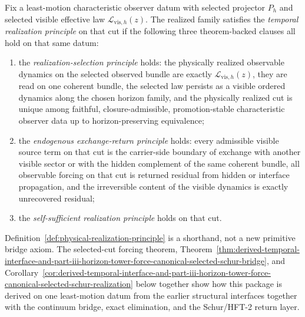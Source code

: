 \begin{definition}
\label{def:physical-realization-principle}
Fix a least-motion characteristic observer datum with selected projector
\(P_h\) and selected visible effective law \(\mathcal L_{\mathrm{vis},h}(z)\).
The realized family satisfies the \emph{temporal realization principle} on that
cut if the following three theorem-backed clauses all hold on that same datum:
\begin{enumerate}[label=(\roman*), leftmargin=2em, itemsep=0.2em]
\item the \emph{realization-selection principle} holds: the physically
      realized observable dynamics on the selected observed bundle are exactly
      \(\mathcal L_{\mathrm{vis},h}(z)\), they are read on one coherent
      bundle, the selected law persists as a visible ordered dynamics along the
      chosen horizon family, and the physically realized cut is unique among
      faithful, closure-admissible, promotion-stable characteristic observer
      data up to horizon-preserving equivalence;
\item the \emph{endogenous exchange-return principle} holds: every admissible
      visible source term on that cut is the carrier-side boundary of exchange
      with another visible sector or with the hidden complement of the same
      coherent bundle, all observable forcing on that cut is returned
      residual from hidden or interface propagation, and the irreversible
      content of the visible dynamics is exactly unrecovered residual;
\item the \emph{self-sufficient realization principle} holds on that cut.
\end{enumerate}
\end{definition}

\begin{remark}
\label{rem:temporal-realization-is-derived}
Definition~\ref{def:physical-realization-principle} is a shorthand, not a new
primitive bridge axiom. The selected-cut forcing theorem,
Theorem~\ref{thm:derived-temporal-interface-and-part-iii-horizon-tower-force-canonical-selected-schur-bridge},
and
Corollary~\ref{cor:derived-temporal-interface-and-part-iii-horizon-tower-force-canonical-selected-schur-realization}
below together show how this package is derived on one least-motion datum from
the earlier structural interfaces together with the continuum bridge, exact
elimination, and the Schur/HFT-2 return
layer.
\end{remark}

